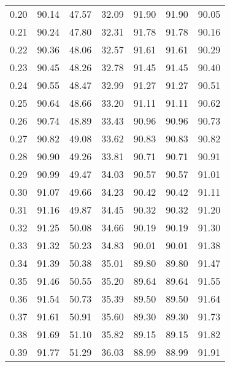 \begin{tabular}{|c|c|c|c|c|c|c|}
      0.20 &     90.14 &     47.57 &      32.09 &   91.90 &      91.90 &         90.05 \\
      0.21 &     90.24 &     47.80 &      32.31 &   91.78 &      91.78 &         90.16 \\
      0.22 &     90.36 &     48.06 &      32.57 &   91.61 &      91.61 &         90.29 \\
      0.23 &     90.45 &     48.26 &      32.78 &   91.45 &      91.45 &         90.40 \\
      0.24 &     90.55 &     48.47 &      32.99 &   91.27 &      91.27 &         90.51 \\
      0.25 &     90.64 &     48.66 &      33.20 &   91.11 &      91.11 &         90.62 \\
      0.26 &     90.74 &     48.89 &      33.43 &   90.96 &      90.96 &         90.73 \\
      0.27 &     90.82 &     49.08 &      33.62 &   90.83 &      90.83 &         90.82 \\
      0.28 &     90.90 &     49.26 &      33.81 &   90.71 &      90.71 &         90.91 \\
      0.29 &     90.99 &     49.47 &      34.03 &   90.57 &      90.57 &         91.01 \\
      0.30 &     91.07 &     49.66 &      34.23 &   90.42 &      90.42 &         91.11 \\
      0.31 &     91.16 &     49.87 &      34.45 &   90.32 &      90.32 &         91.20 \\
      0.32 &     91.25 &     50.08 &      34.66 &   90.19 &      90.19 &         91.30 \\
      0.33 &     91.32 &     50.23 &      34.83 &   90.01 &      90.01 &         91.38 \\
      0.34 &     91.39 &     50.38 &      35.01 &   89.80 &      89.80 &         91.47 \\
      0.35 &     91.46 &     50.55 &      35.20 &   89.64 &      89.64 &         91.55 \\
      0.36 &     91.54 &     50.73 &      35.39 &   89.50 &      89.50 &         91.64 \\
      0.37 &     91.61 &     50.91 &      35.60 &   89.30 &      89.30 &         91.73 \\
      0.38 &     91.69 &     51.10 &      35.82 &   89.15 &      89.15 &         91.82 \\
      0.39 &     91.77 &     51.29 &      36.03 &   88.99 &      88.99 &         91.91 \\

\end{tabular}
